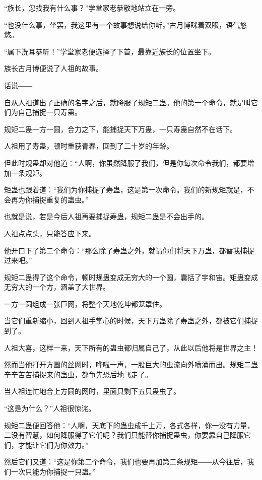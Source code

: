 
\begin{this_body}

“族长，您找我有什么事？”学堂家老恭敬地站立在一旁。

“也没什么事，坐罢，我这里有一个故事想说给你听。”古月博眯着双眼，语气悠悠。

“属下洗耳恭听！”学堂家老便选择了下首，最靠近族长的位置坐下。

族长古月博便说了人祖的故事。

话说――

自从人祖道出了正确的名字之后，就降服了规矩二蛊。他的第一个命令，就是叫它们为自己捕捉一只寿蛊。

规矩二蛊一方一圆，合力之下，能捕捉天下万蛊，一只寿蛊自然不在话下。

人祖用了寿蛊，顿时重获青春，回到了二十岁的年龄。

但此时规蛊却对他道：“人啊，你虽然降服了我们，但是你每次命令我们，都要增加一条规矩。

矩蛊也跟着道：“我们为你捕捉了寿蛊，这是第一次命令。我们的新规矩就是，不会再为你捕捉重复的蛊虫。”

也就是说，若是今后人祖再要捕捉寿蛊，规矩二蛊是不会出手的。

人祖点点头，只能答应下来。

他开口下了第二个命令：“那么除了寿蛊之外，就请你们将天下万蛊，都替我捕捉过来吧。”

规矩二蛊得了这个命令，顿时规蛊变成无穷大的一个圆，囊括了宇和宙。矩蛊变成无穷大的一个方，涵盖了大世界。

一方一圆组成一张巨网，将整个天地乾坤都笼罩住。

当它们重新缩小，回到人祖手掌心的时候，天下万蛊除了寿蛊之外，都被它们捕捉到了。

人祖大喜，这样一来，天下所有的蛊虫都归属自己了，从此以后他将是世界之主！

然而当他打开方圆的丝网时，哗啦一声，一股巨大的虫流向外喷涌而出。规矩二蛊辛辛苦苦捕捉来的蛊虫，都争先恐后地飞走了。

当人祖连忙地合上方圆的网时，里面只剩下五只蛊虫了。

“这是为什么？”人祖很惊诧。

规矩二蛊便回答他：“人啊，天底下的蛊虫成千上万，各式各样，你一没有力量，二没有智慧，如何降服得了它们呢？我们只能替你捕捉蛊虫，你要靠自己降服它们，才能让它们为你效力。”

然后它们又道：“这是你第二个命令，我们也要再加第二条规矩――从今往后，我们一次只能为你捕捉一只蛊。”


\end{this_body}
